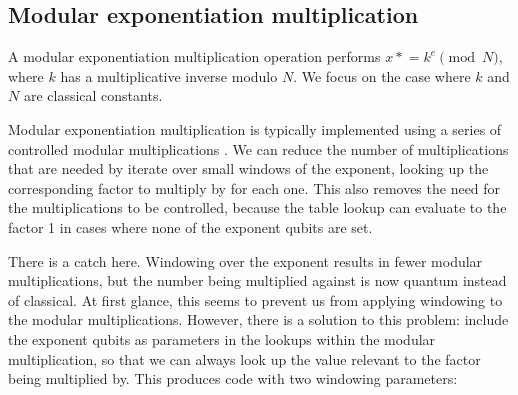 \documentclass[onecolumn,unpublished]{quantumarticle}
\theoremstyle{definition}
\theoremstyle{definition}
\theoremstyle{definition}
\newcommand{\timeseq}{\mathrel{\ast}=}
\begin{document}
\subsection{Modular exponentiation multiplication}

A modular exponentiation multiplication operation performs $x \timeseq k^e \pmod{N}$, where $k$ has a multiplicative inverse modulo $N$.
We focus on the case where $k$ and $N$ are classical constants.

Modular exponentiation multiplication is typically implemented using a series of controlled modular multiplications \cite{vedral1996arithmetic,zalka1998fast,haner2016factoring,gidney2017factoring}.
We can reduce the number of multiplications that are needed by iterate over small windows of the exponent, looking up the corresponding factor to multiply by for each one.
This also removes the need for the multiplications to be controlled, because the table lookup can evaluate to the factor 1 in cases where none of the exponent qubits are set.

There is a catch here.
Windowing over the exponent results in fewer modular multiplications, but the number being multiplied against is now quantum instead of classical.
At first glance, this seems to prevent us from applying windowing to the modular multiplications.
However, there is a solution to this problem: include the exponent qubits as parameters in the lookups within the modular multiplication, so that we can always look up the value relevant to the factor being multiplied by.
This produces code with two windowing parameters:
\end{document}
